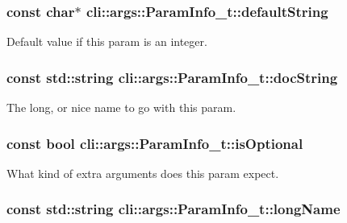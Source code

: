 \subsubsection[{\texorpdfstring{default\+String}{defaultString}}]{\setlength{\rightskip}{0pt plus 5cm}const char$\ast$ cli\+::args\+::\+Param\+Info\+\_\+t\+::default\+String}\hypertarget{structcli_1_1args_1_1_param_info__t_aeed70a91a7078bb08b40119e6d06933a}{}\label{structcli_1_1args_1_1_param_info__t_aeed70a91a7078bb08b40119e6d06933a}


Default value if this param is an integer. 

\subsubsection[{\texorpdfstring{doc\+String}{docString}}]{\setlength{\rightskip}{0pt plus 5cm}const std\+::string cli\+::args\+::\+Param\+Info\+\_\+t\+::doc\+String}\hypertarget{structcli_1_1args_1_1_param_info__t_aafe8b201ba647e59ef10df5e57ce941e}{}\label{structcli_1_1args_1_1_param_info__t_aafe8b201ba647e59ef10df5e57ce941e}


The long, or nice name to go with this param. 

\subsubsection[{\texorpdfstring{is\+Optional}{isOptional}}]{\setlength{\rightskip}{0pt plus 5cm}const bool cli\+::args\+::\+Param\+Info\+\_\+t\+::is\+Optional}\hypertarget{structcli_1_1args_1_1_param_info__t_a9474010a248b831d9658a843e7c4f057}{}\label{structcli_1_1args_1_1_param_info__t_a9474010a248b831d9658a843e7c4f057}


What kind of extra arguments does this param expect. 

\subsubsection[{\texorpdfstring{long\+Name}{longName}}]{\setlength{\rightskip}{0pt plus 5cm}const std\+::string cli\+::args\+::\+Param\+Info\+\_\+t\+::long\+Name}\hypertarget{structcli_1_1args_1_1_param_info__t_a277b5b2ccbf3c8d4cbcec08edfd0101e}{}\label{structcli_1_1args_1_1_param_info__t_a277b5b2ccbf3c8d4cbcec08edfd0101e}


